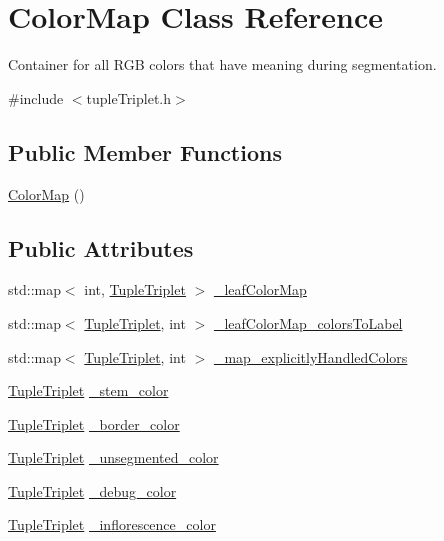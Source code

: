 \hypertarget{classColorMap}{\section{Color\-Map Class Reference}
\label{classColorMap}
}


Container for all R\-G\-B colors that have meaning during segmentation.  




{\ttfamily \#include $<$tuple\-Triplet.\-h$>$}

\subsection*{Public Member Functions}
\begin{DoxyCompactItemize}
\item 
\hyperlink{classColorMap_ae1b5944932c0b018b1faa8d78831f57e}{Color\-Map} ()
\end{DoxyCompactItemize}
\subsection*{Public Attributes}
\begin{DoxyCompactItemize}
\item 
std\-::map$<$ int, \hyperlink{tupleTriplet_8h_a0cdd11cd4d27abbb7b778a8fee3b2397}{Tuple\-Triplet} $>$ \hyperlink{classColorMap_ab9474afada1f2a6e80064c9a96257bb7}{\-\_\-leaf\-Color\-Map}
\item 
std\-::map$<$ \hyperlink{tupleTriplet_8h_a0cdd11cd4d27abbb7b778a8fee3b2397}{Tuple\-Triplet}, int $>$ \hyperlink{classColorMap_ad4a0ffa302e1b5ac1cf56b8228c91c8d}{\-\_\-leaf\-Color\-Map\-\_\-colors\-To\-Label}
\item 
std\-::map$<$ \hyperlink{tupleTriplet_8h_a0cdd11cd4d27abbb7b778a8fee3b2397}{Tuple\-Triplet}, int $>$ \hyperlink{classColorMap_aaf7f6a19620ab4f9bccfc842ccee1a14}{\-\_\-map\-\_\-explicitly\-Handled\-Colors}
\item 
\hyperlink{tupleTriplet_8h_a0cdd11cd4d27abbb7b778a8fee3b2397}{Tuple\-Triplet} \hyperlink{classColorMap_a92b0918914c5748a554c839e4e3c18f7}{\-\_\-stem\-\_\-color}
\item 
\hyperlink{tupleTriplet_8h_a0cdd11cd4d27abbb7b778a8fee3b2397}{Tuple\-Triplet} \hyperlink{classColorMap_ac14da2d8cff300273259beec73527823}{\-\_\-border\-\_\-color}
\item 
\hyperlink{tupleTriplet_8h_a0cdd11cd4d27abbb7b778a8fee3b2397}{Tuple\-Triplet} \hyperlink{classColorMap_a17a0591add2cec4e5c9d266ade02213c}{\-\_\-unsegmented\-\_\-color}
\item 
\hyperlink{tupleTriplet_8h_a0cdd11cd4d27abbb7b778a8fee3b2397}{Tuple\-Triplet} \hyperlink{classColorMap_afed7eeec6dcbe55ab0aefb47e90c5ce4}{\-\_\-debug\-\_\-color}
\item 
\hyperlink{tupleTriplet_8h_a0cdd11cd4d27abbb7b778a8fee3b2397}{Tuple\-Triplet} \hyperlink{classColorMap_a09f8cb11bf9f40129642c4ce9f453b6c}{\-\_\-inflorescence\-\_\-color}
\end{DoxyCompactItemize}


